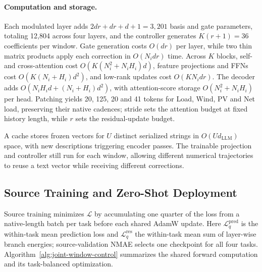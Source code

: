 \documentclass[journal]{IEEEtran}
\begin{document}
\paragraph{Computation and storage.}
Each modulated layer adds $2dr+dr+d+1=3{,}201$ basis and gate parameters, totaling 12,804 across four layers, and the controller generates $K(r+1)=36$ coefficients per window. Gate generation costs $O(dr)$ per layer, while two thin matrix products apply each correction in $O(N_i dr)$ time. Across $K$ blocks, self- and cross-attention cost $O(K(N_i^2+N_iH_i)d)$, feature projections and FFNs cost $O(K(N_i+H_i)d^2)$, and low-rank updates cost $O(KN_i dr)$. The decoder adds $O(N_iH_i d+(N_i+H_i)d^2)$, with attention-score storage $O(N_i^2+N_iH_i)$ per head. Patching yields 20, 125, 20 and 41 tokens for Load, Wind, PV and Net load, preserving their native cadences; stride sets the attention budget at fixed history length, while $r$ sets the residual-update budget.



A cache stores frozen vectors for $U$ distinct serialized strings in $O(Ud_{\mathrm{LLM}})$ space, with new descriptions triggering encoder passes. The trainable projection and controller still run for each window, allowing different numerical trajectories to reuse a text vector while receiving different corrections.


\subsection{Source Training and Zero-Shot Deployment}
\label{sec:algorithms}

Source training minimizes $\mathcal L$ by accumulating one quarter of the loss from a native-length batch per task before each shared AdamW update. Here $\mathcal L_q^{\mathrm{pred}}$ is the within-task mean prediction loss and $\mathcal L_q^{\mathrm{res}}$ the within-task mean sum of layer-wise branch energies; source-validation NMAE selects one checkpoint for all four tasks. Algorithm~\ref{alg:joint-window-control} summarizes the shared forward computation and its task-balanced optimization.
\end{document}
